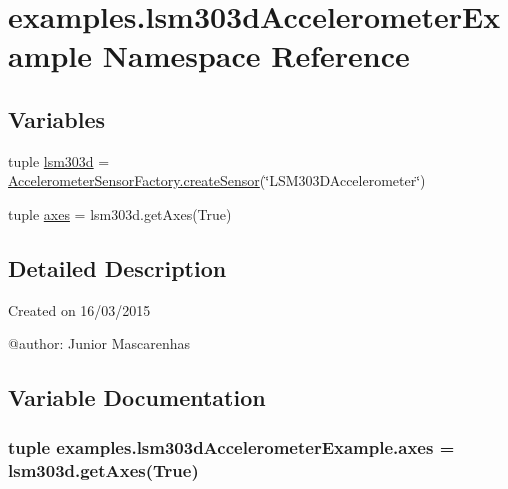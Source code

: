 \hypertarget{namespaceexamples_1_1lsm303dAccelerometerExample}{}\section{examples.\+lsm303d\+Accelerometer\+Example Namespace Reference}
\label{namespaceexamples_1_1lsm303dAccelerometerExample}
\subsection*{Variables}
\begin{DoxyCompactItemize}
\item 
tuple \hyperlink{namespaceexamples_1_1lsm303dAccelerometerExample_a417e4f0eb916b4176b0174046c76a1bf}{lsm303d} = \hyperlink{classconcretefactory_1_1accelerometerSensorFactory_1_1AccelerometerSensorFactory_acc779765811f2da3b7a212550936b63b}{Accelerometer\+Sensor\+Factory.\+create\+Sensor}(\char`\"{}L\+S\+M303\+D\+Accelerometer\char`\"{})
\item 
tuple \hyperlink{namespaceexamples_1_1lsm303dAccelerometerExample_aa5aef3fdd457232dc40bfaeac7bc708f}{axes} = lsm303d.\+get\+Axes(True)
\end{DoxyCompactItemize}


\subsection{Detailed Description}
\begin{DoxyVerb}Created on 16/03/2015

@author: Junior Mascarenhas
\end{DoxyVerb}
 

\subsection{Variable Documentation}
\hypertarget{namespaceexamples_1_1lsm303dAccelerometerExample_aa5aef3fdd457232dc40bfaeac7bc708f}{}
\subsubsection[{axes}]{\setlength{\rightskip}{0pt plus 5cm}tuple examples.\+lsm303d\+Accelerometer\+Example.\+axes = lsm303d.\+get\+Axes(True)}\label{namespaceexamples_1_1lsm303dAccelerometerExample_aa5aef3fdd457232dc40bfaeac7bc708f}
\hypertarget{namespaceexamples_1_1lsm303dAccelerometerExample_a417e4f0eb916b4176b0174046c76a1bf}{}
